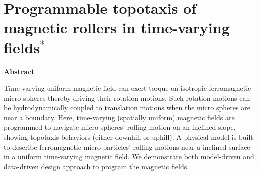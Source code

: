 
\chapter{Programmable topotaxis of magnetic rollers in time-varying fields$^{*}$}


\begin{center}
\vspace*{1\baselineskip}
\textbf{Abstract}
\end{center}
Time-varying uniform magnetic field can exert torque on isotropic ferromagnetic micro spheres thereby driving their rotation motions. Such rotation motions can be hydrodynamically coupled to translation motions when the micro spheres are near a boundary. Here, time-varying (spatially uniform) magnetic fields are  programmed to navigate micro spheres' rolling motion on an inclined slope, showing topotaxis behaviors (either downhill or uphill). A physical model is  built  to describe ferromagnetic micro particles' rolling motions near a inclined surface in a uniform time-varying magnetic field. We demonstrate both model-driven and data-driven design approach to program the magnetic fields. 
 
